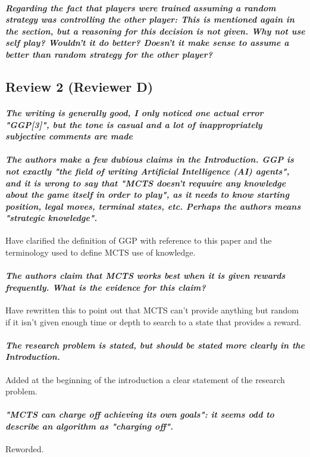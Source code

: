\documentclass{article}
\begin{document}
\paragraph*{\textit{Regarding the fact that players were trained assuming a random strategy was controlling the other player: This is mentioned again in the section, but a reasoning for this decision is not given. Why not use self play? Wouldn't it do better? Doesn't it make sense to assume a better than random strategy for the other player?}}

\subsection{Review 2 (Reviewer D)}
\paragraph*{\textit{The writing is generally good, I only noticed one actual error "GGP[3]", but the tone is casual and a lot of inappropriately subjective comments are made}}
\paragraph*{\textit{The authors make a few dubious claims in the Introduction. GGP is not exactly "the field of writing Artificial Intelligence (AI) agents", and it is wrong to say that "MCTS doesn't requuire any knowledge about the game itself in order to play", as it needs to know starting position, legal moves, terminal states, etc. Perhaps the authors means "strategic knowledge". }}
Have clarified the definition of GGP with reference to this paper\cite{genesereth2005general} and the terminology used to define MCTS use of knowledge. 
\paragraph*{\textit{The authors claim that MCTS works best when it is given rewards frequently. What is the evidence for this claim?}}
Have rewritten this to point out that MCTS can't provide anything but random if it isn't given enough time or depth to search to a state that provides a reward.
\paragraph*{\textit{The research problem is stated, but should be stated more clearly in the Introduction.}}
Added at the beginning of the introduction a clear statement of the research problem.
\paragraph*{\textit{"MCTS can charge off achieving its own goals": it seems odd to describe an algorithm as "charging off".}}
Reworded.
\end{document}
